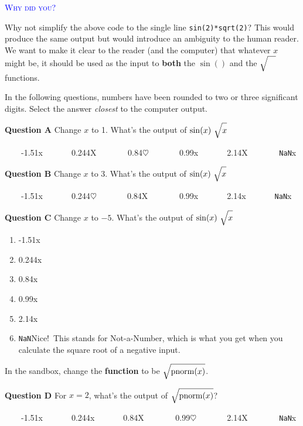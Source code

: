 \documentclass[
  letterpaper,
  DIV=11,
  numbers=noendperiod,
  oneside]{article}
\providecommand{\tightlist}{%
  \setlength{\itemsep}{0pt}\setlength{\parskip}{0pt}}\usepackage{longtable,booktabs,array}
\newenvironment{why}%
{%
\textcolor{blue}{\hrulefill}%
  \par\vspace{.3\baselineskip}%
  \textcolor{blue}{\scshape Why did you?}%
  \par\vspace{\baselineskip}%
}%
{\textcolor{blue}{\hrulefill}}
\newcommand{\pnorm}{\text{pnorm}}
\begin{document}
\begin{multicols}{2}
\begin{why}
Why not simplify the above code to the single line
\texttt{sin(2)*sqrt(2)}? This would produce the same output but would
introduce an ambiguity to the human reader. We want to make it clear to
the reader (and the computer) that whatever \(x\) might be, it should be
used as the input to \textbf{both} the \(\sin()\) and the
\(\sqrt{\strut\ \ \ }\) functions.

\end{why}

In the following questions, numbers have been rounded to two or three
significant digits. Select the answer \emph{closest} to the computer
output.

\textbf{Question A} Change \(x\) to 1. What's the output of
\(\sin(x) \ \sqrt{\strut x}\)

~~~~{-1.51{x}}~~~~~~~{0.244{︎X
}}~~~~~~~{0.84{\(\heartsuit\ \)}}~~~~~~~{0.99{x}}~~~~~~~{2.14{︎X
}}~~~~~~~{\texttt{NaN}{x}}

\textbf{Question B} Change \(x\) to 3. What's the output of
\(\sin(x) \  \sqrt{\strut x}\)

~~~~{-1.51{x}}~~~~~~~{0.244{\(\heartsuit\ \)}}~~~~~~~{0.84{︎X
}}~~~~~~~{0.99{x}}~~~~~~~{2.14{x}}~~~~~~~{\texttt{NaN}{x}}

\textbf{Question C} Change \(x\) to \(-5\). What's the output of
\(\sin(x) \  \sqrt{\strut x}\)

\begin{enumerate}
\def\labelenumi{\roman{enumi}.}
\tightlist
\item
  {-1.51{x}}\\
\item
  {0.244{x}}\\
\item
  {0.84{x}}\\
\item
  {0.99{x}}\\
\item
  {2.14{x}}\\
\item
  {\texttt{NaN}{Nice!~This stands for Not-a-Number, which is what you
  get when you calculate the square root of a negative input.}}
\end{enumerate}

In the sandbox, change the \textbf{function} to be
\(\sqrt{\strut\pnorm(x)}\).

\textbf{Question D} For \(x=2\), what's the output of
\(\sqrt{\strut\pnorm(x)}\)?

~~~~{-1.51{x}}~~~~~~~{0.244{x}}~~~~~~~{0.84{︎X
}}~~~~~~~{0.99{\(\heartsuit\ \)}}~~~~~~~{2.14{︎X
}}~~~~~~~{\texttt{NaN}{x}}


\end{multicols}
\end{document}
